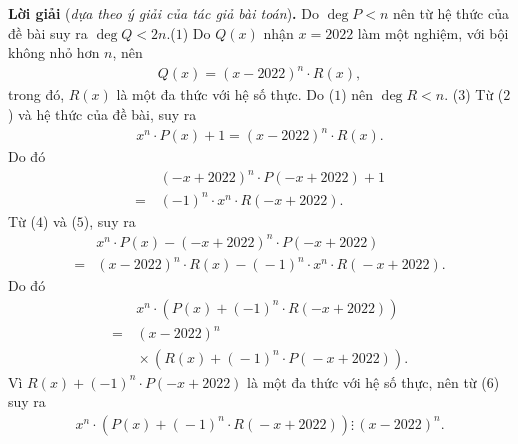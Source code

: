 \begin{multicols}{2}
	\vskip 0.05cm
	\textbf{\color{thachthuctoanhoc}Lời giải} (\textit{dựa theo ý giải của tác giả bài toán})\textbf{\color{thachthuctoanhoc}.}
	\vskip 0.05cm
	Do  $\deg P < n$ nên từ hệ thức của đề bài suy ra  $\deg Q < 	2n.$\hfill ($1$)
	\vskip 0.05cm
	Do $Q(x)$  nhận $x = 2022$ làm một nghiệm, với bội không nhỏ hơn $n$, nên
	\begin{align*}
		Q\left( x \right) = {\left( {x - 2022} \right)^n} \cdot R\left( x \right), \tag{$2$}
	\end{align*}
	trong đó, $R(x)$  là một đa thức với hệ số thực. Do ($1$) nên    $\deg R < n.$ \hfill ($3$)
	\vskip 0.05cm
	Từ ($2$) và hệ thức của đề bài, suy ra
	\begin{align*}
		{x^n} \cdot P\left( x \right) + 1 = {\left( {x - 2022} \right)^n} \cdot R\left( x \right). \tag{$4$}
	\end{align*}
	Do đó
	\begin{align*}
		&{\left( { - x + 2022} \right)^n} \cdot P\left( { - x + 2022} \right) + 1\\ = \,&{\left( { - 1} \right)^n} \cdot {x^n} \cdot R\left( { - x + 2022} \right). \tag{$5$}
	\end{align*}
	Từ ($4$) và ($5$), suy ra
	\begin{align*}
		&{x^n} \cdot P\left( x \right) - {\left( { - x + 2022} \right)^n} \cdot P\left( { - x + 2022} \right) \\
		= &{\left( {x \!-\! 2022} \right)^n} \!\cdot\! R\left( x \right) \!-\! {\left( { \!-\! 1}\! \right)^n} \!\cdot\! {x^n} \!\cdot\! R\left( { \!-\! x \!+\! 2022} \right)\!.
	\end{align*}
	Do đó
	\begin{align*}
		&{x^n} \cdot \left( {P\left( x \right) + {{\left( { - 1} \right)}^n} \cdot R\left( { - x + 2022} \right)} \right) \\
		= \,&{\left( {x - 2022} \right)^n} \\
		&\!\times\! \left( {R\left( x \right) \!+\! {{\left( { \!-\! 1} \right)}^n} \!\cdot\! P\left( { \!-\! x \!+\! 2022} \right)} \right). \tag{$6$}
	\end{align*}
	Vì $R\left( x \right) + {\left( { - 1} \right)^n} \cdot P\left( { - x + 2022} \right)$  là một đa thức với hệ số thực, nên từ ($6$) suy ra
	\begin{align*}
		{x^n} \!\cdot\! \left( {P\left( x \right) \!+\! {{\left( { \!-\! 1} \right)}^n} \!\cdot\! R\left( { \!-\! x \!+\! 2022} \right)} \!\right) \vdots\, {\left( {x \!-\! 2022} \right)^n}.
	\end{align*}

\end{multicols}
